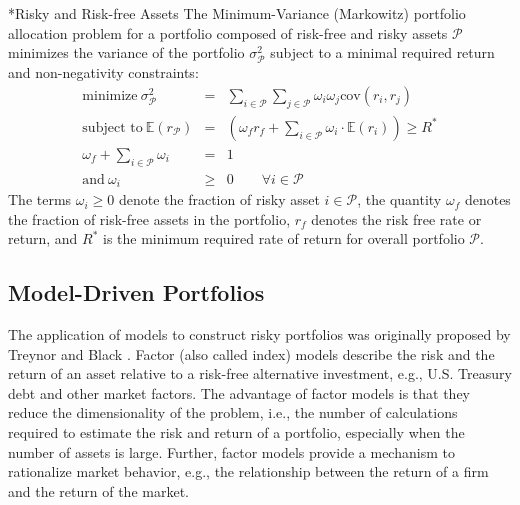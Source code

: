 \documentclass[11pt]{article}
\makeatletter
\theoremstyle{definition}
\renewcommand\subsubsection{\@startsection
	{subsubsection}{2}{0mm}
	{-0.05in}
	{-0.5\baselineskip}
	{\normalfont\normalsize\itshape\bfseries}}
\makeatother
\begin{document}
\subsubsection*{Risky and Risk-free Assets}\label{subsec:risky-and-risk-free-assets}
The Minimum-Variance (Markowitz) portfolio allocation problem for a portfolio composed of risk-free and risky assets $\mathcal{P}$ 
minimizes the variance of the portfolio $\sigma_{\mathcal{P}}^2$ 
subject to a minimal required return and non-negativity constraints: 
\begin{eqnarray*}
\text{minimize}~\sigma_{\mathcal{P}}^2 &=& \sum_{i\in\mathcal{P}}\sum_{j\in\mathcal{P}}\omega_{i}\omega_{j}
\text{cov}\left(r_{i},r_{j}\right) \\
\text{subject to}~\mathbb{E}(r_{\mathcal{P}})& = & \left(\omega_{f}r_{f}+\sum_{i\in\mathcal{P}}\omega_{i}\cdot\mathbb{E}(r_{i})\right)\geq{R^{*}}\\
\omega_{f}+\sum_{i\in\mathcal{P}}\omega_{i} & = & 1 \\
\text{and}~\omega_{i}&\geq&{0}\qquad{\forall{i}\in\mathcal{P}}
\end{eqnarray*}
The terms $\omega_{i}\geq{0}$ denote the fraction of risky asset $i\in\mathcal{P}$, 
the quantity $\omega_{f}$ denotes the fraction of risk-free assets in the portfolio, 
$r_{f}$ denotes the risk free rate or return, and $R^{*}$ is the minimum required rate of return 
for overall portfolio $\mathcal{P}$.

\subsection{Model-Driven Portfolios}\label{sec:factor-model-portfolio-problems}
The application of models to construct risky portfolios was originally proposed by Treynor and Black \cite{FB1973}. 
Factor (also called index) models describe the risk and the return of an asset relative to a risk-free alternative investment, 
e.g., U.S. Treasury debt and other market factors. The advantage of factor models is that they reduce the dimensionality of the problem, i.e., 
the number of calculations required to estimate the risk and return of a portfolio, especially when the number of assets is large. Further,
factor models provide a mechanism to rationalize market behavior, e.g., the relationship between the return of a firm and the return of the market.
\end{document}
